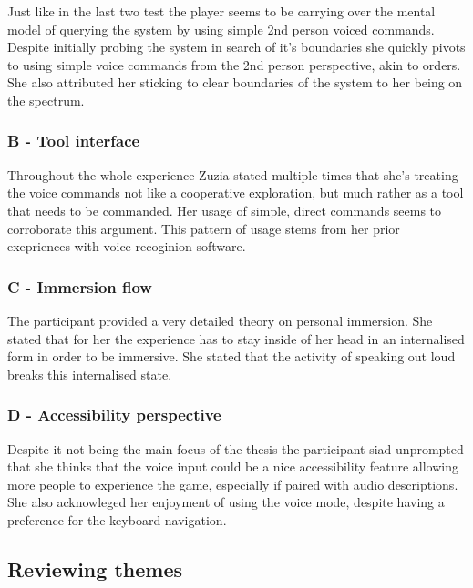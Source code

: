 Just like in the last two test the player seems to be carrying over the mental model of querying the system by using simple 2nd person voiced commands. Despite initially probing the system in search of it's boundaries she quickly pivots to using simple voice commands from the 2nd person perspective, akin to orders. She also attributed her sticking to clear boundaries of the system to her being on the spectrum.



\subsubsection{B - Tool interface}

Throughout the whole experience Zuzia stated multiple times that she's treating the voice commands not like a cooperative exploration, but much rather as a tool that needs to be commanded. Her usage of simple, direct commands seems to corroborate this argument. This pattern of usage stems from her prior exepriences with voice recoginion software. 


\subsubsection{C - Immersion flow}

The participant provided a very detailed theory on personal immersion. She stated that for her the experience has to stay inside of her head in an internalised form in order to be immersive. She stated that the activity of speaking out loud breaks this internalised state. 

\subsubsection{D - Accessibility perspective}

Despite it not being the main focus of the thesis the participant siad unprompted that she thinks that the voice input could be a nice accessibility feature allowing more people to experience the game, especially if paired with audio descriptions. She also acknowleged her enjoyment of using the voice mode, despite having a preference for the keyboard navigation. 


\subsection{Reviewing themes}




